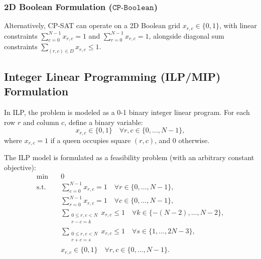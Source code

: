 \documentclass[a4paper,fleqn]{cas-sc}
\begin{document}
\subsubsection{2D Boolean Formulation ($\mathtt{CP\text{-}Boolean}$)}
Alternatively, CP-SAT can operate on a 2D Boolean grid $x_{r, c} \in \{0, 1\}$, with linear constraints $\sum_{c=0}^{N-1} x_{r, c} = 1$ and $\sum_{r=0}^{N-1} x_{r, c} = 1$, alongside diagonal sum constraints $\sum_{(r, c) \in D} x_{r, c} \le 1$.

\subsection{Integer Linear Programming (ILP/MIP) Formulation}
In ILP, the problem is modeled as a 0-1 binary integer linear program. For each row $r$ and column $c$, define a binary variable:
\begin{equation}
    x_{r, c} \in \{0, 1\} \quad \forall r, c \in \{0, \dots, N-1\},
\end{equation}
where $x_{r, c} = 1$ if a queen occupies square $(r, c)$, and $0$ otherwise.

The ILP model is formulated as a feasibility problem (with an arbitrary constant objective):
\begin{align}
    \min \quad & 0 \label{eq:ilp_obj} \\
    \text{s.t.} \quad & \sum_{c=0}^{N-1} x_{r, c} = 1 \quad \forall r \in \{0, \dots, N-1\}, \label{eq:ilp_row} \\
    & \sum_{r=0}^{N-1} x_{r, c} = 1 \quad \forall c \in \{0, \dots, N-1\}, \label{eq:ilp_col} \\
    & \sum_{\substack{0 \le r, c < N \\ r - c = k}} x_{r, c} \le 1 \quad \forall k \in \{-(N-2), \dots, N-2\}, \label{eq:ilp_d1} \\
    & \sum_{\substack{0 \le r, c < N \\ r + c = s}} x_{r, c} \le 1 \quad \forall s \in \{1, \dots, 2N-3\}, \label{eq:ilp_d2} \\
    & x_{r, c} \in \{0, 1\} \quad \forall r, c \in \{0, \dots, N-1\}. \label{eq:ilp_domain}
\end{align}
\end{document}
